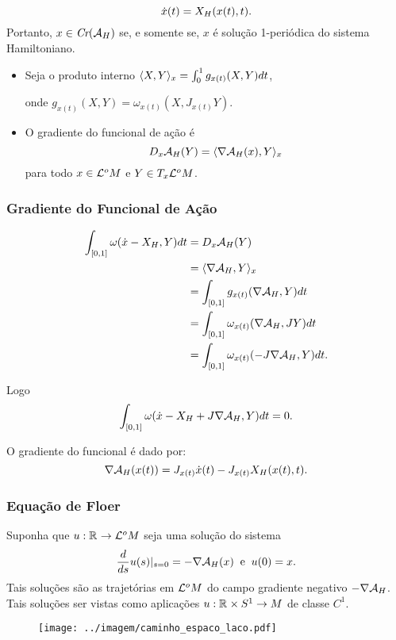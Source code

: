 \documentclass{beamer}
\begin{document}
\begin{footnotesize}
\begin{frame}
\begin{prova}
			$$
			\dot{x}(t) =X_{H}(x(t), t).
			$$
			Portanto, $x \in \textit{Cr}(\mathcal{A}_{H})$ se, e somente se, $x$ é solução 1-periódica do sistema Hamiltoniano. 
		\end{prova}
		\begin{itemize}
			\item 
			Seja o produto interno $ \langle X, Y \rangle_{x} = \int_{0}^{1}g_{x(t)}(X, Y)dt$, 
			
			onde $g_{x(t)}(X,Y) = \omega_{x(t)}(X,J_{x(t)}Y)$.
			
			\item O gradiente do funcional de ação é 
			$$
			D_{x}\mathcal{A}_{H}(Y) = \langle \nabla \mathcal{A}_{H}(x), Y \rangle_{x}
			$$
			para todo $x \in \mathcal{L}^{o}M$ e $Y \in T_{x}\mathcal{L}^{o}M$.
			
			
		\end{itemize}	
	\end{frame}
	
	\begin{frame}
		\frametitle{Gradiente do Funcional de Ação}
		$$
		\begin{aligned}
		\int_{[0,1]} \omega(\dot{x} - X_{H}, Y)dt&=
		D_{x}\mathcal{A}_{H}(Y)
		\\ 
		&= \langle \nabla \mathcal{A}_{H}, Y \rangle_{x}
		\\
		&= \int_{[0,1]}g_{x(t)}(\nabla \mathcal{A}_{H}, Y)dt
		\\
		&=\int_{[0,1]} \omega_{x(t)}(\nabla \mathcal{A}_{H}, JY)dt
		\\
		&=\int_{[0,1]} \omega_{x(t)}(-J\nabla \mathcal{A}_{H}, Y)dt.
		\end{aligned}
		$$
				
			
		Logo
		$$
		\int_{[0,1]} \omega(\dot{x} - X_{H} + J\nabla \mathcal{A}_{H}, Y)dt = 0.
		$$
		\begin{block}{O gradiente do funcional é dado por:}
			$$
			\nabla \mathcal{A}_{H}(x(t))= J_{x(t)}\dot{x}(t)-J_{x(t)}X_{H}(x(t), t).
			$$
		\end{block}
		
	\end{frame}
	
	\begin{frame}
		\frametitle{Equação de Floer}
		Suponha que $u :\mathbb{R}^{}\to \mathcal{L}^{o}M$ seja uma solução do sistema 
	$$
	\frac{d }{d s}u(s)|_{s=0} = -\nabla \mathcal{A}_{H}(x) \;\;\text{e}\;\;u(0)=x.
	$$
	Tais soluções são as trajetórias em $\mathcal{L}^{o}M$ do campo gradiente negativo $-\nabla \mathcal{A}_{H}$. Tais soluções ser vistas como aplicações $u:\mathbb{R}^{} \times S^{1} \to M$ de classe $C^{1}$.
	\begin{figure}[!h]
		\centering
		\texttt{[image: ../imagem/caminho\_espaco\_laco.pdf]}
	\end{figure} 
		

\end{frame}
\end{footnotesize}
\end{document}
